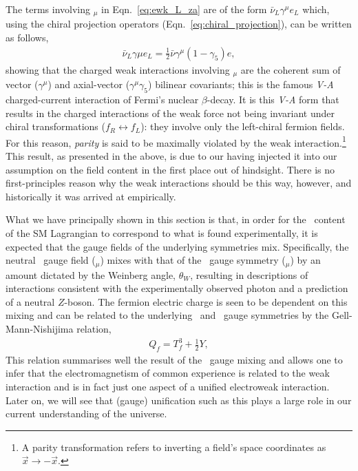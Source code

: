 The terms involving \fieldWpm$_{\mu}$ in Eqn.~\ref{eq:ewk_L_za} are
of the form $\bar{\nu}_L \gamma^{\mu} e_L$
which, using the chiral projection operators (Eqn.~\ref{eq:chiral_projection}), can be
written as follows,
\begin{align}
	\bar{\nu}_L \gamma{\mu} e_L = \frac{1}{2} \bar{\nu} \gamma^{\mu}(1-\gamma_5) e,
	\label{eq:v_minus_a}
\end{align}
showing that the charged weak interactions involving \fieldWpm$_{\mu}$ are the coherent
sum of vector ($\gamma^{\mu}$) and axial-vector ($\gamma^{\mu}\gamma_5$) bilinear covariants; this is the famous
\textit{V-A} charged-current interaction of Fermi's nuclear $\beta$-decay.
It is this \textit{V-A} form that results in the charged interactions of the weak force
not being invariant under chiral transformations ($f_R \leftrightarrow f_L$): they involve only
the left-chiral fermion fields. For this reason, \textit{parity}
is said to be maximally violated by the weak interaction.\footnote{A parity transformation
	refers to inverting a field's space coordinates as $\vec{x} \rightarrow -\vec{x}$.}
This result, as presented in the above, is due to our having injected
it into our assumption on the field content in the first place out of hindsight. There
is no first-principles reason why the weak interactions should be this way, however,
and historically it was arrived at empirically.

What we have principally shown in this section is that, in order for the \SUewk~content of
the SM Lagrangian to correspond to what is found experimentally, it is expected that
the gauge fields of the underlying symmetries mix. Specifically, the neutral \SUtwo~gauge field
(\fieldWzero$_{\mu}$) mixes with that of the \Uone~gauge symmetry (\fieldB$_{\mu}$) by an amount
dictated by the Weinberg angle, $\theta_W$, resulting in descriptions of interactions consistent
with the experimentally observed photon and a prediction of a neutral $Z$-boson. 
The fermion electric charge is seen to be dependent on this mixing
and can be related to the underlying \SUtwo~and \Uone~gauge symmetries by the
Gell-Mann-Nishijima relation,
\begin{align}
	Q_f = T_f^3 + \frac{1}{2}Y,
	\label{eq:gell_mann_nishijima}
\end{align}
This relation summarises well the result of the \SUewk~gauge mixing and allows one to
infer that the electromagnetism of common experience
is related to the weak interaction and is in fact just one aspect of a unified electroweak interaction.
Later on, we will see that (gauge) unification such as this plays a large role in our
current understanding of the universe.

